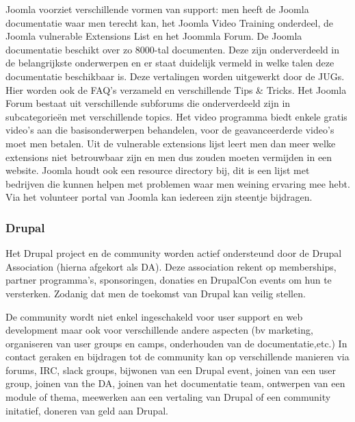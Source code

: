 Joomla voorziet verschillende vormen van support: men heeft de Joomla documentatie waar men terecht kan, het Joomla Video Training onderdeel, de Joomla vulnerable Extensions List en het Joommla Forum. De Joomla documentatie beschikt over zo 8000-tal documenten. Deze zijn onderverdeeld in de belangrijkste onderwerpen en er staat duidelijk vermeld in welke talen deze documentatie beschikbaar is. Deze vertalingen worden uitgewerkt door de JUGs. Hier worden ook de FAQ's verzameld en verschillende Tips \& Tricks. Het Joomla Forum bestaat uit verschillende subforums die onderverdeeld zijn in subcategorieën met verschillende topics. Het video programma biedt enkele gratis video's aan die basisonderwerpen behandelen, voor de geavanceerderde video's moet men betalen. Uit de vulnerable extensions lijst leert men dan meer welke extensions niet betrouwbaar zijn en men dus zouden moeten vermijden in een website. Joomla houdt ook een resource directory bij, dit is een lijst met bedrijven die kunnen helpen met problemen waar men weining ervaring mee hebt. Via het volunteer portal van Joomla kan iedereen zijn steentje bijdragen.

\subsubsection{Drupal}
Het Drupal project en de community worden actief ondersteund door de Drupal Association (hierna afgekort als DA). Deze association rekent op memberships, partner programma's, sponsoringen, donaties en DrupalCon events om hun te versterken. Zodanig dat men de toekomst van Drupal kan veilig stellen. 

De community wordt niet enkel ingeschakeld voor user support en web development maar ook voor verschillende andere aspecten (bv marketing, organiseren van user groups en camps, onderhouden van de documentatie,etc.) In contact geraken en bijdragen tot de community kan op verschillende manieren via forums, IRC, slack groups, bijwonen van een Drupal event, joinen van een user group, joinen van the DA, joinen van het documentatie team, ontwerpen van een module of thema, meewerken aan een vertaling van Drupal of een community initatief, doneren van geld aan Drupal. 

